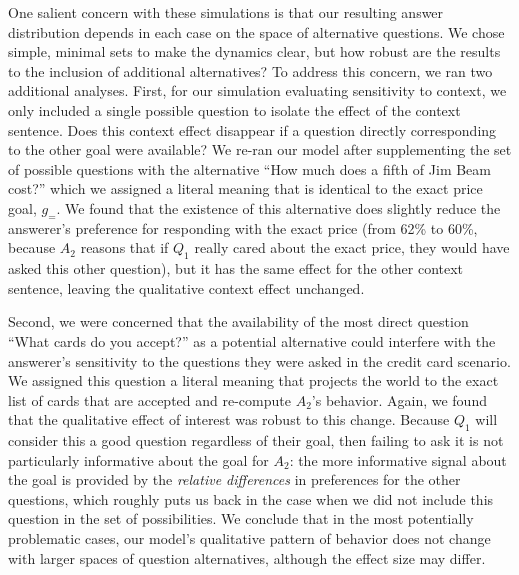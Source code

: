 \documentclass[11pt, floatsintext]{apa6}
\begin{document}

One salient concern with these simulations is that our resulting answer distribution depends in each case on the space of alternative questions.
We chose simple, minimal sets to make the dynamics clear, but how robust are the results to the inclusion of additional alternatives?
To address this concern, we ran two additional analyses.
First, for our simulation evaluating sensitivity to context, we only included a single possible question to isolate the effect of the context sentence.
Does this context effect disappear if a question directly corresponding to the other goal were available?
We re-ran our model after supplementing the set of possible questions with the alternative ``How much does a fifth of Jim Beam cost?'' which we assigned a literal meaning that is identical to the exact price goal, $g_{=}$.
We found that the existence of this alternative does slightly reduce the answerer's preference for responding with the exact price (from 62\% to 60\%, because $A_2$ reasons that if $Q_1$ really cared about the exact price, they would have asked this other question), but it has the same effect for the other context sentence, leaving the qualitative context effect unchanged.

Second, we were concerned that the availability of the most direct question ``What cards do you accept?'' as a potential alternative could interfere with the answerer's sensitivity to the questions they were asked in the credit card scenario. 
We assigned this question a literal meaning that projects the world to the exact list of cards that are accepted and re-compute $A_2$'s behavior.
Again, we found that the qualitative effect of interest was robust to this change. 
Because $Q_1$ will consider this a good question regardless of their goal, then failing to ask it is not particularly informative about the goal for $A_2$: the more informative signal about the goal is provided by the \emph{relative differences} in preferences for the other questions, which roughly puts us back in the case when we did not include this question in the set of possibilities.
We conclude that in the most potentially problematic cases, our model's qualitative pattern of behavior does not change with larger spaces of question alternatives, although the effect size may differ.
\end{document}
